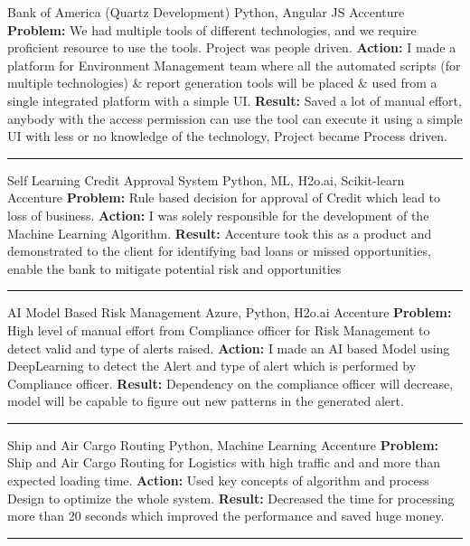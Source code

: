 \begin{cventries}
	\cventry
	{}
	{Bank of America (Quartz Development)}
	{Python, Angular JS}
	{Accenture}
	{\textbf{Problem:} We had multiple tools of different technologies, and we require proficient resource to use the tools. Project was people driven.\newline
		\textbf{Action:} I made a platform for Environment Management team where all the automated scripts (for multiple technologies) \& report generation tools will be placed \& used from a single integrated platform with a simple UI.\newline
		\textbf{Result:} Saved a lot of manual effort, anybody with the access permission can use the tool can execute it using a simple UI with less or no knowledge of the technology, Project became Process driven.
	}
	\begin{center}
		\rule{30mm}{.1mm}
	\end{center}
	\cventry
	{}
	{Self Learning Credit Approval System}
	{Python, ML, H2o.ai, Scikit-learn}
	{Accenture}
	{\textbf{Problem:} Rule based decision for approval of Credit which lead to loss of business.\newline
		\textbf{Action:} I was solely responsible for the development of the Machine Learning Algorithm.\newline
		\textbf{Result:} Accenture took this as a product and demonstrated to the client for identifying bad loans or missed opportunities, enable the bank to mitigate potential risk and opportunities
	}
	\begin{center}
		\rule{30mm}{.1mm}
	\end{center}
	\cventry
	{
	}
	{AI Model Based Risk Management}
	{Azure, Python, H2o.ai}
	{Accenture}
	{\textbf{Problem:} High level of manual effort from Compliance officer for Risk Management to detect valid and type of alerts raised.\newline
		\textbf{Action:} I made an AI based Model using DeepLearning to detect the Alert and type of alert which is performed by Compliance officer.\newline
		\textbf{Result:} Dependency on the compliance officer will decrease, model will be capable to figure out new patterns in the generated alert.
	}
	\begin{center}
		\rule{30mm}{.1mm}
	\end{center}

	\cventry
	{}
	{Ship and Air Cargo Routing}
	{Python, Machine Learning}
	{Accenture}
	{\textbf{Problem:} Ship and Air Cargo Routing for Logistics with high traffic and and more than expected loading time.\newline
		\textbf{Action:} Used key concepts of algorithm and process Design to optimize the whole system.\newline
		\textbf{Result:} Decreased the time for processing more than 20 seconds which improved the performance and saved huge money.}
	\begin{center}
		\rule{30mm}{.1mm}
	\end{center}


\end{cventries}

